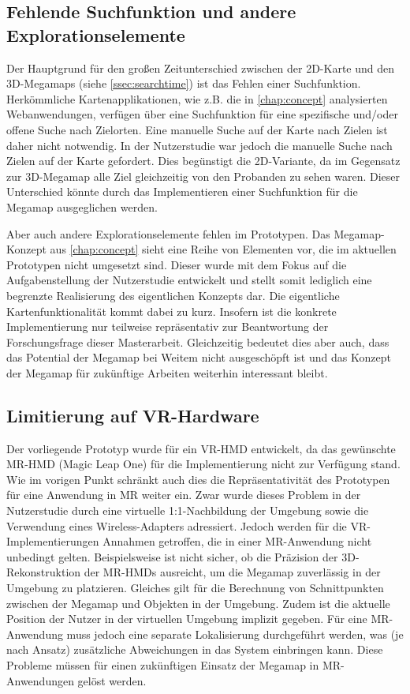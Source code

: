\subsection*{Fehlende Suchfunktion und andere Explorationselemente}
Der Hauptgrund für den großen Zeitunterschied zwischen der 2D-Karte und den 3D-Megamaps (siehe \autoref{ssec:searchtime}) ist das Fehlen einer Suchfunktion.
Herkömmliche Kartenapplikationen, wie z.B. die in \autoref{chap:concept} analysierten Webanwendungen, verfügen über eine Suchfunktion für eine spezifische und/oder offene Suche nach Zielorten.
Eine manuelle Suche auf der Karte nach Zielen ist daher nicht notwendig.
In der Nutzerstudie war jedoch die manuelle Suche nach Zielen auf der Karte gefordert.
Dies begünstigt die 2D-Variante, da im Gegensatz zur 3D-Megamap alle Ziel gleichzeitig von den Probanden zu sehen waren.
Dieser Unterschied könnte durch das Implementieren einer Suchfunktion für die Megamap ausgeglichen werden.

Aber auch andere Explorationselemente fehlen im Prototypen.
Das Megamap-Konzept aus \autoref{chap:concept} sieht eine Reihe von Elementen vor, die im aktuellen Prototypen nicht umgesetzt sind.
Dieser wurde mit dem Fokus auf die Aufgabenstellung der Nutzerstudie entwickelt und stellt somit lediglich eine begrenzte Realisierung des eigentlichen Konzepts dar.
Die eigentliche Kartenfunktionalität kommt dabei zu kurz.
Insofern ist die konkrete Implementierung nur teilweise repräsentativ zur Beantwortung der Forschungsfrage dieser Masterarbeit.
Gleichzeitig bedeutet dies aber auch, dass das Potential der Megamap bei Weitem nicht ausgeschöpft ist und das Konzept der Megamap für zukünftige Arbeiten weiterhin interessant bleibt.

\subsection*{Limitierung auf VR-Hardware}
Der vorliegende Prototyp wurde für ein VR-HMD entwickelt, da das gewünschte MR-HMD (Magic Leap One) für die Implementierung nicht zur Verfügung stand.
Wie im vorigen Punkt schränkt auch dies die Repräsentativität des Prototypen für eine Anwendung in MR weiter ein.
Zwar wurde dieses Problem in der Nutzerstudie durch eine virtuelle 1:1-Nachbildung der Umgebung sowie die Verwendung eines Wireless-Adapters adressiert.
Jedoch werden für die VR-Implementierungen Annahmen getroffen, die in einer MR-Anwendung nicht unbedingt gelten.
Beispielsweise ist nicht sicher, ob die Präzision der 3D-Rekonstruktion der MR-HMDs ausreicht, um die Megamap zuverlässig in der Umgebung zu platzieren.
Gleiches gilt für die Berechnung von Schnittpunkten zwischen der Megamap und Objekten in der Umgebung.
Zudem ist die aktuelle Position der Nutzer in der virtuellen Umgebung implizit gegeben.
Für eine MR-Anwendung muss jedoch eine separate Lokalisierung durchgeführt werden, was (je nach Ansatz) zusätzliche Abweichungen in das System einbringen kann.
Diese Probleme müssen für einen zukünftigen Einsatz der Megamap in MR-Anwendungen gelöst werden.

